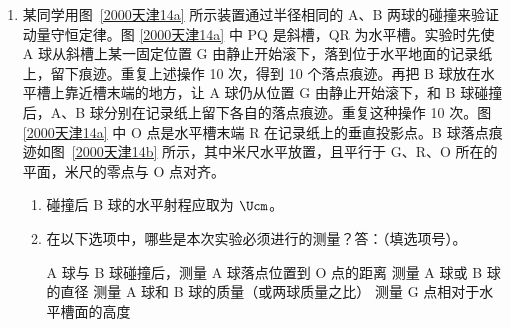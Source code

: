 \documentclass[\gkver]{gaokaozhenti}
\begin{document}
\begin{enumerate}
{正负电荷之间相对位置的变化，引起两个电荷电势能的变化。当距离变大时，电场力做负功，需要吸收能量：先把 $\ce{NaCl}$ 变成 $\ce{Na+}$ 和 $\ce{Cl-}$ 吸收能量 $6.1\UeV$，再将 $\ce{Na+}$ 变成 $\ce{Na}$ 的过程放出能量 $5.1\UeV$，同时将 $\ce{Cl-}$ 变成 $\ce{Cl}$，电场力做负功、电势能增大，也就是吸收能量。整个过程可以看成由两个吸收能量和一个放出能量的过程组成。

评分标准：本题 5 分，答案正确给 5 分，答错或不答给 0 分。
}

\item
某同学用图~\ref{2000天津14a} 所示装置通过半径相同的 A、B 两球的碰撞来验证动量守恒定律。图 \ref{2000天津14a} 中 PQ 是斜槽，QR 为水平槽。实验时先使 A 球从斜槽上某一固定位置 G 由静止开始滚下，落到位于水平地面的记录纸上，留下痕迹。重复上述操作 10 次，得到 10 个落点痕迹。再把 B 球放在水平槽上靠近槽末端的地方，让 A 球仍从位置 G 由静止开始滚下，和 B 球碰撞后，A、B 球分别在记录纸上留下各自的落点痕迹。重复这种操作 10 次。图 \ref{2000天津14a} 中 O 点是水平槽末端 R 在记录纸上的垂直投影点。B 球落点痕迹如图~\ref{2000天津14b} 所示，其中米尺水平放置，且平行于 G、R、O 所在的平面，米尺的零点与 O 点对齐。


\begin{enumerate}
\item
碰撞后 B 球的水平射程应取为  $\Ucm$。

\item
在以下选项中，哪些是本次实验必须进行的测量？答：（填选项号）。

{A 球与 B 球碰撞后，测量 A 球落点位置到 O 点的距离}
{测量 A 球或 B 球的直径}
{测量 A 球和 B 球的质量（或两球质量之比）}
{测量 G 点相对于水平槽面的高度}
\end{enumerate}


\end{enumerate}
\end{document}
